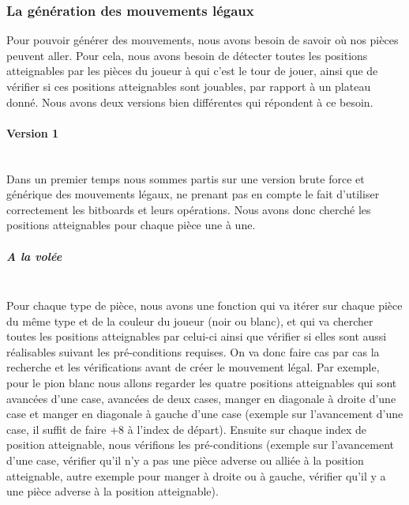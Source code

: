 \documentclass{article}
\begin{document}
\subsubsection{La génération des mouvements légaux}
Pour pouvoir générer des mouvements, nous avons besoin de savoir où nos pièces peuvent aller.
Pour cela, nous avons besoin de détecter toutes les positions atteignables par les pièces du joueur à qui c’est le tour de jouer, ainsi que de vérifier si ces positions atteignables sont jouables, par rapport à un plateau donné.
Nous avons deux versions bien différentes qui répondent à ce besoin.

\paragraph{Version 1} \label{mouvements_legaux_v1}
~~\\
\newline
Dans un premier temps nous sommes partis sur une version brute force et générique des mouvements légaux, ne prenant pas en compte le fait d’utiliser correctement les bitboards \cite{Bitboards} et leurs opérations.
Nous avons donc cherché les positions atteignables pour chaque pièce une à une.

\subparagraph{A la volée}
~~\\
\newline
Pour chaque type de pièce, nous avons une fonction qui va itérer sur chaque pièce du même type et de la couleur du joueur (noir ou blanc), et qui va chercher toutes les positions atteignables par celui-ci ainsi que vérifier si elles sont aussi réalisables suivant les pré-conditions requises.
On va donc faire cas par cas la recherche et les vérifications avant de créer le mouvement légal.
Par exemple, pour le pion blanc nous allons regarder les quatre positions atteignables qui sont avancées d'une case, avancées de deux cases, manger en diagonale à droite d'une case et manger en diagonale à gauche d'une case (exemple sur l'avancement d'une case, il suffit de faire +8 à l'index de départ).
Ensuite sur chaque index de position atteignable, nous vérifions les pré-conditions (exemple sur l'avancement d'une case, vérifier qu'il n'y a pas une pièce adverse ou alliée à la position atteignable, autre exemple pour manger à droite ou à gauche, vérifier qu'il y a une pièce adverse à la position atteignable).
\end{document}
